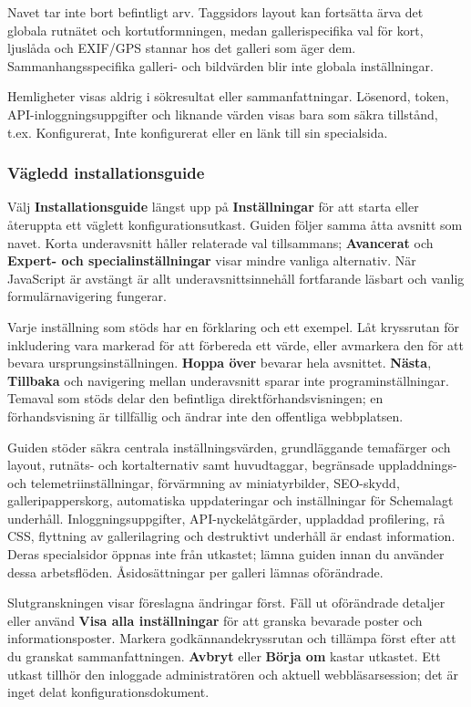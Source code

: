 \documentclass[11pt,a4paper]{article}
\newcommand{\ui}[1]{\textbf{#1}}
\begin{document}
Navet tar inte bort befintligt arv. Taggsidors layout kan fortsätta ärva det
globala rutnätet och kortutformningen, medan gallerispecifika val för kort,
ljuslåda och EXIF/GPS stannar hos det galleri som äger dem. Sammanhangsspecifika
galleri- och bildvärden blir inte globala inställningar.

Hemligheter visas aldrig i sökresultat eller sammanfattningar. Lösenord, token,
API-in\-logg\-nings\-upp\-gif\-ter och liknande värden visas bara som säkra
tillstånd, t.ex. Konfigurerat, Inte konfigurerat eller en länk till sin
specialsida.

\subsubsection{Vägledd installationsguide}

Välj \ui{Installationsguide} längst upp på \ui{Inställningar} för att starta
eller återuppta ett väglett konfigurationsutkast. Guiden följer samma åtta
avsnitt som navet. Korta underavsnitt håller relaterade val tillsammans;
\ui{Avancerat} och \ui{Expert- och specialinställningar} visar mindre vanliga
alternativ. När JavaScript är avstängt är allt underavsnittsinnehåll fortfarande
läsbart och vanlig formulärnavigering fungerar.

Varje inställning som stöds har en förklaring och ett exempel. Låt kryssrutan
för inkludering vara markerad för att förbereda ett värde, eller avmarkera den
för att bevara ursprungsinställningen. \ui{Hoppa över} bevarar hela avsnittet.
\ui{Nästa}, \ui{Tillbaka} och navigering mellan underavsnitt sparar inte
programinställningar. Temaval som stöds delar den befintliga
direktförhandsvisningen; en förhandsvisning är tillfällig och ändrar inte den
offentliga webbplatsen.

Guiden stöder säkra centrala inställningsvärden, grundläggande temafärger och
layout, rutnäts- och kortalternativ samt huvudtaggar, begränsade uppladdnings-
och telemetriinställningar, förvärmning av miniatyrbilder, SEO-skydd,
galleripapperskorg, automatiska uppdateringar och inställningar för Schemalagt
underhåll. Inloggningsuppgifter, API-nyckelåtgärder, uppladdad profilering, rå
CSS, flyttning av gallerilagring och destruktivt underhåll är endast
information. Deras specialsidor öppnas inte från utkastet; lämna guiden innan du
använder dessa arbetsflöden. Åsidosättningar per galleri lämnas oförändrade.

Slutgranskningen visar föreslagna ändringar först. Fäll ut oförändrade detaljer
eller använd \ui{Visa alla inställningar} för att granska bevarade poster och
informationsposter. Markera godkännandekryssrutan och tillämpa först efter att
du granskat sammanfattningen. \ui{Avbryt} eller \ui{Börja om} kastar utkastet.
Ett utkast tillhör den inloggade administratören och aktuell webbläsarsession;
det är inget delat konfigurationsdokument.
\end{document}
